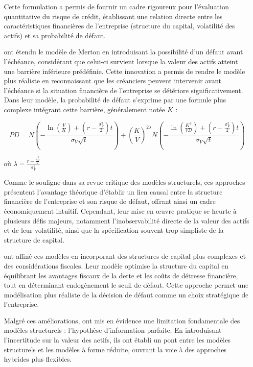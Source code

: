 Cette formulation a permis de fournir un cadre rigoureux pour l'évaluation quantitative du risque de crédit, établissant une relation directe entre les caractéristiques financières de l'entreprise (structure du capital, volatilité des actifs) et sa probabilité de défaut.

\citet{black1976} ont étendu le modèle de Merton en introduisant la possibilité d'un défaut avant l'échéance, considérant que celui-ci survient lorsque la valeur des actifs atteint une barrière inférieure prédéfinie. Cette innovation a permis de rendre le modèle plus réaliste en reconnaissant que les créanciers peuvent intervenir avant l'échéance si la situation financière de l'entreprise se détériore significativement. Dans leur modèle, la probabilité de défaut s'exprime par une formule plus complexe intégrant cette barrière, généralement notée $K$ :

\begin{equation}
PD = N\left(-\frac{\ln(\frac{V}{K}) + (r - \frac{\sigma_V^2}{2})t}{\sigma_V\sqrt{t}}\right) + \left(\frac{K}{V}\right)^{2\lambda}N\left(-\frac{\ln(\frac{K^2}{VD}) + (r - \frac{\sigma_V^2}{2})t}{\sigma_V\sqrt{t}}\right)
\end{equation}

où $\lambda = \frac{r - \frac{\sigma_V^2}{2}}{\sigma_V^2}$

Comme le souligne \citet{sundaresan2013} dans sa revue critique des modèles structurels, ces approches présentent l'avantage théorique d'établir un lien causal entre la structure financière de l'entreprise et son risque de défaut, offrant ainsi un cadre économiquement intuitif. Cependant, leur mise en œuvre pratique se heurte à plusieurs défis majeurs, notamment l'inobservabilité directe de la valeur des actifs et de leur volatilité, ainsi que la spécification souvent trop simpliste de la structure de capital.

\citet{leland1996} ont affiné ces modèles en incorporant des structures de capital plus complexes et des considérations fiscales. Leur modèle optimise la structure du capital en équilibrant les avantages fiscaux de la dette et les coûts de détresse financière, tout en déterminant endogènement le seuil de défaut. Cette approche permet une modélisation plus réaliste de la décision de défaut comme un choix stratégique de l'entreprise.

Malgré ces améliorations, \citet{duffie2001} ont mis en évidence une limitation fondamentale des modèles structurels : l'hypothèse d'information parfaite. En introduisant l'incertitude sur la valeur des actifs, ils ont établi un pont entre les modèles structurels et les modèles à forme réduite, ouvrant la voie à des approches hybrides plus flexibles.

